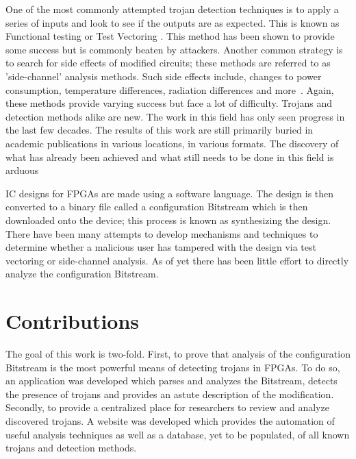 One of the most commonly attempted trojan detection techniques is to apply a series of inputs and look to see if the outputs are as expected.
This is known as Functional testing or Test Vectoring \cite{kSubset,monteCarloTestPattern,towardsDetectionMethodology}.
This method has been shown to provide some success but is commonly beaten by attackers.
Another common strategy is to search for side effects of modified circuits; these methods are referred to as 'side-channel' analysis methods.
Such side effects include, changes to power consumption, temperature differences, radiation differences and more~\cite{sideChannelObfuscation, postLayout, controllableSleepTransistors, pcaAlgorithm}.
Again, these methods provide varying success but face a lot of difficulty.
Trojans and detection methods alike are new.
The work in this field has only seen progress in the last few decades.
The results of this work are still primarily buried in academic publications in various locations, in various formats.
The discovery of what has already been achieved and what still needs to be done in this field is arduous 

\acrshort{IC} designs for \acrfull{FPGAs} are made using a software language.
The design is then converted to a binary file called a configuration \gls{Bitstream} which is then downloaded onto the device; this process is known as synthesizing the design.
There have been many attempts to develop mechanisms and techniques to determine whether a malicious user has tampered with the design via test vectoring or side-channel analysis.
As of yet there has been little effort to directly analyze the configuration \gls{Bitstream}.


\section{Contributions}
The goal of this work is two-fold.
First, to prove that analysis of the configuration \gls{Bitstream} is the most powerful means of detecting trojans in \acrshort{FPGA}s.
To do so, an application was developed which parses and analyzes the \gls{Bitstream}, detects the presence of trojans and provides an astute description of the modification.
Secondly, to provide a centralized place for researchers to review and analyze discovered trojans.
A website was developed which provides the automation of useful analysis techniques as well as a database, yet to be populated, of all known trojans and detection methods. 

